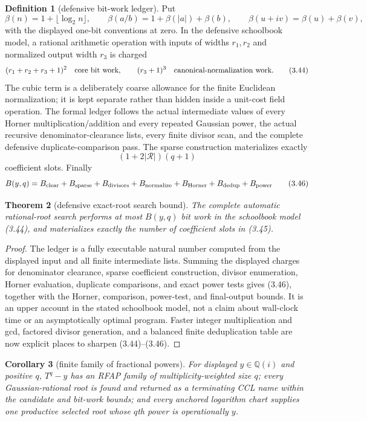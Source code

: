 \documentclass[10pt]{article}
\newtheorem{theorem}{Theorem}[section]
\newtheorem{corollary}[theorem]{Corollary}
\theoremstyle{definition}
\newtheorem{definition}[theorem]{Definition}
\theoremstyle{remark}
\newcommand{\Qi}{\mathbb{Q}(i)}
\begin{document}
\begin{definition}[defensive bit-work ledger]
Put
\[
 \beta(n)=1+\lfloor\log_2 n\rfloor,\qquad
 \beta(a/b)=1+\beta(|a|)+\beta(b),\qquad
 \beta(u+iv)=\beta(u)+\beta(v),
 \tag{3.43}
\]
with the displayed one-bit conventions at zero.  In the defensive
schoolbook model, a rational arithmetic operation with inputs of widths
$r_1,r_2$ and normalized output width $r_3$ is charged
\[
 (r_1+r_2+r_3+1)^2
 \quad\hbox{core bit work},\qquad
 (r_3+1)^3
 \quad\hbox{canonical-normalization work}.
 \tag{3.44}
\]
The cubic term is a deliberately coarse allowance for the finite Euclidean
normalization; it is kept separate rather than hidden inside a unit-cost
field operation.  The formal ledger follows the actual intermediate values
of every Horner multiplication/addition and every repeated Gaussian power,
the actual recursive denominator-clearance lists, every finite divisor scan,
and the complete defensive duplicate-comparison pass.  The sparse
construction materializes exactly
\[
 (1+2|\mathcal R|)(q+1)
 \tag{3.45}
\]
coefficient slots.  Finally
\[
 B(y,q)=B_{\rm clear}+B_{\rm sparse}+B_{\rm divisors}
       +B_{\rm normalize}+B_{\rm Horner}+B_{\rm dedup}+B_{\rm power}
 \tag{3.46}
\]
\end{definition}

\begin{theorem}[defensive exact-root search bound]
The complete automatic rational-root search performs at most $B(y,q)$ bit
work in the schoolbook model (3.44), and materializes exactly the number of
coefficient slots in (3.45).
\end{theorem}

\begin{proof}
The ledger is a fully executable natural number computed from the displayed input and
all finite intermediate lists.  Summing the displayed charges for denominator
clearance, sparse coefficient construction, divisor enumeration, Horner
evaluation, duplicate comparisons, and exact power tests gives (3.46),
together with the Horner, comparison, power-test, and final-output bounds.  It is an upper
account in the stated schoolbook model, not a claim about wall-clock time or
an asymptotically optimal program.  Faster integer
multiplication and gcd, factored divisor generation, and a balanced finite
deduplication table are now explicit places to sharpen (3.44)--(3.46).
\end{proof}

\begin{corollary}[finite family of fractional powers]
\label{thm:finite-root-family}
For displayed $y\in\Qi$ and positive $q$, $T^q-y$ has an RFAP family of
multiplicity-weighted size $q$; every Gaussian-rational root is found and
returned as a terminating CCL name within the candidate and bit-work bounds;
and every anchored logarithm chart supplies one productive selected root
whose $q$th power is operationally $y$.
\end{corollary}
\end{document}
